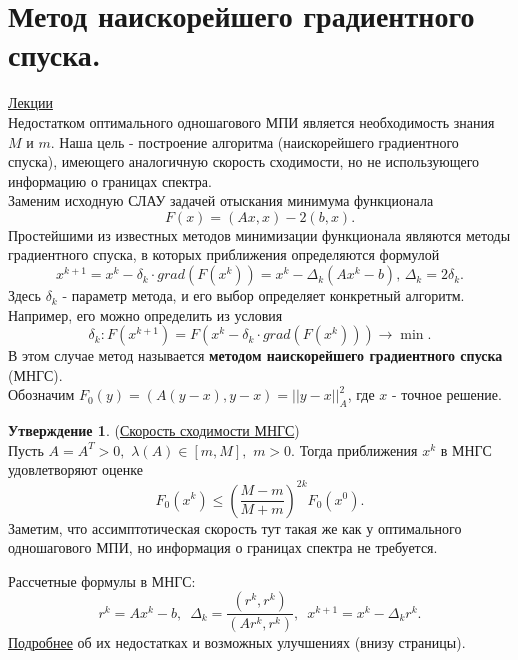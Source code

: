\documentclass[specialist, subf, href, colorlinks=true, 12pt, times, mtpro, final]{disser}
\theoremstyle{definition}
\newtheorem{state}{Утверждение}[section]
\begin{document}
{\section {Метод наискорейшего градиентного спуска.}
    \hyperlink {lects.68}{Лекции}\\
    Недостатком оптимального одношагового МПИ является необходимость знания $M$ и $m$.
    Наша цель - построение алгоритма (наискорейшего градиентного спуска), имеющего
    аналогичную скорость сходимости, но не использующего информацию о границах спектра.\\
    Заменим исходную СЛАУ задачей отыскания минимума функционала
    $$
       F(x) = (Ax, x) - 2(b,x).
    $$
    Простейшими из известных методов минимизации функционала являются методы градиентного
    спуска, в которых приближения определяются формулой
    $$
        x^{k+1} = x^k - \delta_k\cdot grad(F(x^k)) = x^k - \Delta_k (Ax^k - b), \,
        \Delta_k = 2\delta_k.
    $$
    Здесь $\delta_k$ - параметр метода, и его выбор определяет конкретный алгоритм.
    Например, его можно определить из условия
    $$
        \delta_k: F(x^{k+1}) = F(x^k - \delta_k\cdot grad(F(x^k))) \rightarrow \min.
    $$
    В этом случае метод называется {\bf методом наискорейшего градиентного спуска} (МНГС).\\
    Обозначим $F_0(y) = (A(y-x), y-x) = ||y-x||_A^2$, где $x$ - точное решение.
    \begin{state} (\hyperlink {lects.69}{Скорость сходимости МНГС})\\
    Пусть $A = A^T > 0, \,\, \lambda(A) \in [m, M], \,\, m > 0$. Тогда приближения $x^k$
    в МНГС удовлетворяют оценке
    $$
        F_0(x^k) \le \left(\frac{M-m}{M+m}\right)^{2k}F_0(x^0).
    $$
    Заметим, что ассимптотическая скорость тут такая же как у оптимального одношагового МПИ,
    но информация о границах спектра не требуется.
    \end{state}
    Рассчетные формулы в МНГС:
    $$
        r^k = Ax^k - b,\,\,\, \Delta_k = \frac{(r^k, r^k)}{(Ar^k, r^k)}, \,\,\,
        x^{k+1} = x^k - \Delta_k r^{k}.
    $$
    \hyperlink {lects.70}{Подробнее} об их недостатках и возможных улучшениях
    (внизу страницы).

}
\end{document}
